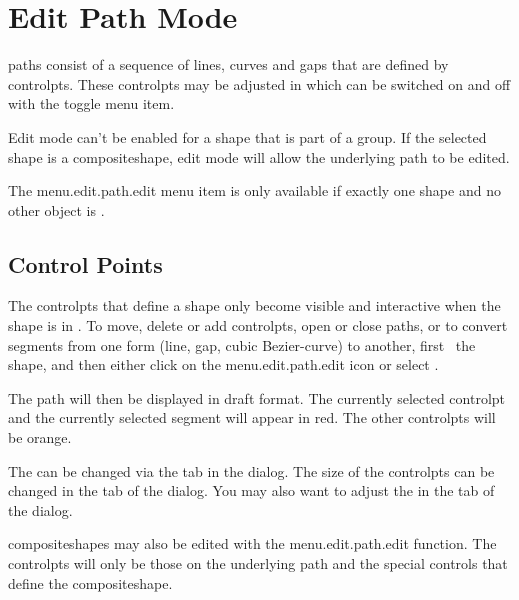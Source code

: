 \section{Edit Path Mode}\label{sec:editpath}


\Glspl{path} consist of a sequence of lines, curves and \glspl{gap} 
that are defined by \glspl{controlpt}. These \glspl{controlpt} may be adjusted in
\emph{} which can be switched on and off
with the  toggle menu item.

\begin{information}
Edit mode can't be enabled for a \gls{shape} that is part of a \gls{group}.
If the selected shape is a \gls{compositeshape}, edit mode will allow the
underlying path to be edited.
\end{information}

The \gls{menu.edit.path.edit} menu item
is only available if exactly one \gls{shape} and no other
\gls{object} is \selected.

\subsection{Control Points}\label{sec:editcontrolpt}

The \glspl{controlpt} that define a \gls{shape} only become visible
and interactive when the shape is in \editpathmode.
To move, delete or add \glspl{controlpt}, open or close
\glspl{path}, or to convert segments from one form (line, \gls{gap}, cubic
\gls{Bezier-curve}) to another, first \select\ the \gls*{shape}, and
then either click on the \gls{menu.edit.path.edit} icon or select
.

The \gls*{path} will then be displayed in draft format.  The
currently selected \gls*{controlpt} and the currently selected
segment will appear in red. The other \glspl*{controlpt} will be
orange.

\begin{information}
The  can be changed via the 
tab in the  dialog. The size of the
\glspl{controlpt} can be changed in the  tab
of the  dialog. You may also want to adjust the
 in the  tab of the
 dialog.
\end{information}

\Glspl{compositeshape} may also be edited with 
the \gls{menu.edit.path.edit} function. The
\glspl{controlpt} will only be those on the underlying path and 
the special controls that define the \gls{compositeshape}.


